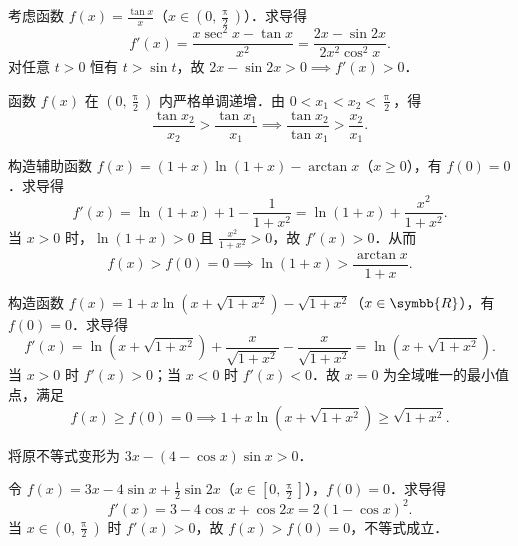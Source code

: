 \begin{myproof}

    考虑函数 $f(x) = \frac{\tan x}{x}$（$x \in \left(0, \frac{\uppi}{2}\right)$）．求导得
    \begin{equation}
        f'(x) = \frac{x\sec^2 x - \tan x}{x^2} = \frac{2x - \sin 2x}{2x^2 \cos^2 x}.
    \end{equation}
    对任意 $t > 0$ 恒有 $t > \sin t$，故 $2x - \sin 2x > 0 \implies f'(x) > 0$．

    函数 $f(x)$ 在 $\left(0, \frac{\uppi}{2}\right)$ 内严格单调递增．由 $0 < x_1 < x_2 < \frac{\uppi}{2}$，得
    \begin{equation}
        \frac{\tan x_2}{x_2} > \frac{\tan x_1}{x_1} \implies \frac{\tan x_2}{\tan x_1} > \frac{x_2}{x_1}.
    \end{equation}


    构造辅助函数 $f(x) = (1+x)\ln(1+x) - \arctan x$（$x \geqslant 0$），有 $f(0) = 0$．求导得
    \begin{equation}
        f'(x) = \ln(1+x) + 1 - \frac{1}{1+x^2} = \ln(1+x) + \frac{x^2}{1+x^2}.
    \end{equation}
    当 $x > 0$ 时，$\ln(1+x) > 0$ 且 $\frac{x^2}{1+x^2} > 0$，故 $f'(x) > 0$．从而
    \begin{equation}
        f(x) > f(0) = 0 \implies \ln(1+x) > \frac{\arctan x}{1+x}.
    \end{equation}


    构造函数 $f(x) = 1 + x\ln(x+\sqrt{1+x^2}) - \sqrt{1+x^2}$（$x \in \symbb{R}$），有 $f(0) = 0$．求导得
    \begin{equation}
        f'(x) = \ln(x+\sqrt{1+x^2}) + \frac{x}{\sqrt{1+x^2}} - \frac{x}{\sqrt{1+x^2}} = \ln(x+\sqrt{1+x^2}).
    \end{equation}
    当 $x > 0$ 时 $f'(x) > 0$；当 $x < 0$ 时 $f'(x) < 0$．故 $x = 0$ 为全域唯一的最小值点，满足
    \begin{equation}
        f(x) \geqslant f(0) = 0 \implies 1 + x\ln(x+\sqrt{1+x^2}) \geqslant \sqrt{1+x^2}.
    \end{equation}


    将原不等式变形为 $3x - (4 - \cos x)\sin x > 0$．

    令 $f(x) = 3x - 4\sin x + \frac{1}{2}\sin 2x$（$x \in \left[0, \frac{\uppi}{2}\right]$），$f(0) = 0$．求导得
    \begin{equation}
        f'(x) = 3 - 4\cos x + \cos 2x = 2(1 - \cos x)^2.
    \end{equation}
    当 $x \in \left(0, \frac{\uppi}{2}\right)$ 时 $f'(x) > 0$，故 $f(x) > f(0) = 0$，不等式成立．


\end{myproof}

